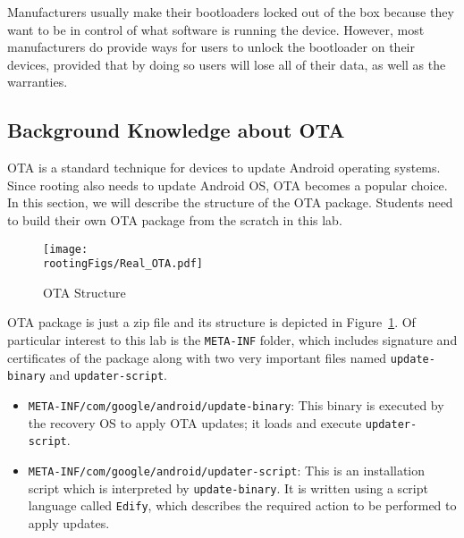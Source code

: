 Manufacturers usually make their bootloaders locked out of
the box because they want to be in control of what software is running the
device. However, most manufacturers do provide ways for users to unlock the bootloader on their devices, 
provided that by doing so users will lose all of their data, as well as the warranties.  



\subsection{Background Knowledge about OTA}

OTA is a standard technique for devices to update Android operating systems. Since rooting
also needs to update Android OS, OTA becomes a popular choice. In this section, we will
describe the structure of the OTA package. Students need to build their own OTA package from
the scratch in this lab.


\begin{figure}[htb]
	\begin{center}
		\texttt{[image: \\rootingFigs/Real\_OTA.pdf]}
	\end{center}
	\caption{OTA Structure}
	\label{fig:rooting:real_OTA}
\end{figure}
 

OTA package is just a zip file and its structure is depicted in 
Figure~\ref{fig:rooting:real_OTA}. Of particular interest to this lab is the 
\texttt{META-INF} folder, which includes signature and certificates of the package along with
two very important files named \texttt{update-binary} and \texttt{updater-script}.

\begin{itemize} 
\item \texttt{META-INF/com/google/android/update-binary}: This binary is executed
by the recovery OS to apply OTA updates; it loads and execute
\texttt{updater-script}.

\item \texttt{META-INF/com/google/android/updater-script}: This is an installation
script which is interpreted by \texttt{update-binary}. It is written using a script
language called \texttt{Edify}, which describes the required action to be performed
to apply updates. 

\end{itemize}

